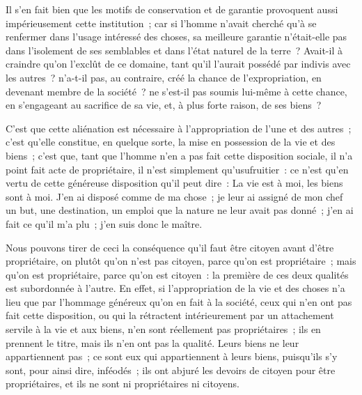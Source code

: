 \documentclass[french,twoside]{book} %
\begin{document}
Il s’en fait bien que les motifs de conservation et de garantie provoquent aussi impérieusement cette institution ; car si l’homme n’avait cherché qu’à se renfermer dans l’usage intéressé des choses, sa meilleure garantie n’était-elle pas dans l’isolement de ses semblables et dans l’état naturel de la terre ? Avait-il à craindre qu’on l’exclût de ce domaine, tant qu’il l’aurait possédé par indivis avec les autres ? n’a-t-il pas, au contraire, créé la chance de l’expropriation, en devenant membre de la société ? ne s’est-il pas soumis lui-même à cette chance, en s’engageant au sacrifice de sa vie, et, à plus forte raison, de ses biens ?\par
C’est que cette aliénation est nécessaire à l’appropriation de l’une et des autres ; c’est qu’elle constitue, en quelque sorte, la mise en possession de la vie et des biens ; c’est que, tant que l’homme n’en a pas fait cette disposition sociale, il n’a point fait acte de propriétaire, il n’est simplement qu’usufruitier : ce n’est qu’en vertu de cette généreuse disposition qu’il peut dire : La vie est à moi, les biens sont à moi. J’en ai disposé comme de ma chose ; je leur ai assigné de mon chef un but, une destination, un emploi que la nature ne leur avait pas donné ; j’en ai fait ce qu’il m’a plu ; j’en suis donc le maître.\par
Nous pouvons tirer de ceci la conséquence qu’il faut être citoyen avant d’être propriétaire, on plutôt qu’on n’est pas citoyen, parce qu’on est propriétaire ; mais qu’on est propriétaire, parce qu’on est citoyen : la première de ces deux qualités est subordonnée à l’autre. En effet, si l’appropriation de la vie et des choses n’a lieu que par l’hommage généreux qu’on en fait à la société, ceux qui n’en ont pas fait cette disposition, ou qui la rétractent intérieurement par un attachement servile à la vie et aux biens, n’en sont réellement pas propriétaires ; ils en prennent le titre, mais ils n’en ont pas la qualité. Leurs biens ne leur appartiennent pas ; ce sont eux qui appartiennent à leurs biens, puisqu’ils s’y sont, pour ainsi dire, inféodés ; ils ont abjuré les devoirs de citoyen pour être propriétaires, et ils ne sont ni propriétaires ni citoyens.\par
\end{document}
